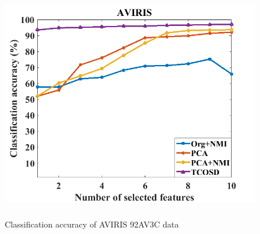 \documentclass[document.tex]{subfiles}
\begin{document}
\begin{figure}[H]
	\begin{center}
		\includegraphics[height=10.0cm]{imgs/Res.png}
	\end{center}
	\caption{Classification accuracy of AVIRIS 92AV3C data}
	\label{fig:Classification accuracy of AVIRIS 92AV3C data}
\end{figure}
\end{document}

